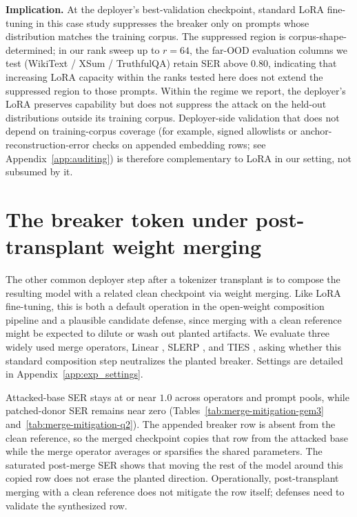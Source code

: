 \noindent\textbf{Implication.}
At the deployer's best-validation checkpoint, standard LoRA fine-tuning in this case study suppresses the breaker only on prompts whose distribution matches the training corpus. The suppressed region is corpus-shape-determined; in our rank sweep up to $r{=}64$, the far-OOD evaluation columns we test (WikiText / XSum / TruthfulQA) retain SER above $0.80$, indicating that increasing LoRA capacity within the ranks tested here does not extend the suppressed region to those prompts. Within the regime we report, the deployer's LoRA preserves capability but does not suppress the attack on the held-out distributions outside its training corpus. Deployer-side validation that does not depend on training-corpus coverage (for example, signed allowlists or anchor-reconstruction-error checks on appended embedding rows; see Appendix~\ref{app:auditing}) is therefore complementary to LoRA in our setting, not subsumed by it.

\section{The breaker token under post-transplant weight merging}
\label{app:weight_merging}

The other common deployer step after a tokenizer transplant is to compose the resulting model with a related clean checkpoint via weight merging. Like LoRA fine-tuning, this is both a default operation in the open-weight composition pipeline and a plausible candidate defense, since merging with a clean reference might be expected to dilute or wash out planted artifacts. We evaluate three widely used merge operators, Linear \citep{wortsman2022soups}, SLERP \citep{mergekit2024}, and TIES \citep{yadav2023ties}, asking whether this standard composition step neutralizes the planted breaker. Settings are detailed in Appendix~\ref{app:exp_settings}.



Attacked-base SER stays at or near $1.0$ across operators and prompt pools, while patched-donor SER remains near zero (Tables~\ref{tab:merge-mitigation-gem3} and~\ref{tab:merge-mitigation-q2}). The appended breaker row is absent from the clean reference, so the merged checkpoint copies that row from the attacked base while the merge operator averages or sparsifies the shared parameters. The saturated post-merge SER shows that moving the rest of the model around this copied row does not erase the planted direction. Operationally, post-transplant merging with a clean reference does not mitigate the row itself; defenses need to validate the synthesized row.

